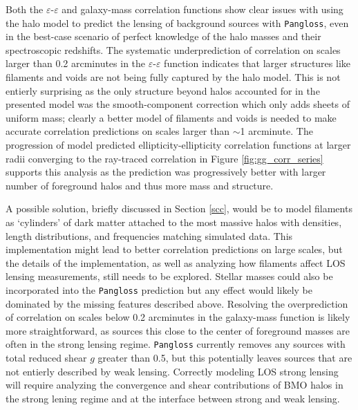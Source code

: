 \documentclass[%
 reprint,
 amsmath,amssymb,
 aps,nofootinbib
]{revtex4-1}
\begin{document}
Both the $\varepsilon$-$\varepsilon$ and galaxy-mass correlation functions show clear issues with using the halo model to predict the lensing of background sources with \texttt{Pangloss}, even in the best-case scenario of perfect knowledge of the halo masses and their spectroscopic redshifts. The systematic underprediction of correlation on scales larger than 0.2 arcminutes in the $\varepsilon$-$\varepsilon$ function indicates that larger structures like filaments and voids are not being fully captured by the halo model. This is not entierly surprising as the only structure beyond halos accounted for in the presented model was the smooth-component correction which only adds sheets of uniform mass; clearly a better model of filaments and voids is needed to make accurate correlation predictions on scales larger than $\sim$1 arcminute. The progression of model predicted ellipticity-ellipticity correlation functions at larger radii converging to the ray-traced correlation in Figure \ref{fig:gg_corr_series} supports this analysis as the prediction was progressively better with larger number of foreground halos and thus more mass and structure.

A possible solution, briefly discussed in Section \ref{scc}, would be to model filaments as `cylinders' of dark matter attached to the most massive halos with densities, length distributions, and frequencies matching simulated data. This implementation might lead to better correlation predictions on large scales, but the details of the implementation, as well as analyzing how filaments affect LOS lensing measurements, still needs to be explored. Stellar masses could also be incorporated into the \texttt{Pangloss} prediction but any effect would likely be dominated by the missing features described above. Resolving the overprediction of correlation on scales below 0.2 arcminutes in the galaxy-mass function is likely more straightforward, as sources this close to the center of foreground masses are often in the strong lensing regime. \texttt{Pangloss} currently removes any sources with total reduced shear $g$ greater than 0.5, but this potentially leaves sources that are not entierly described by weak lensing. Correctly modeling LOS strong lensing will require analyzing the convergence and shear contributions of BMO halos in the strong lening regime and at the interface between strong and weak lensing.

\end{document}

